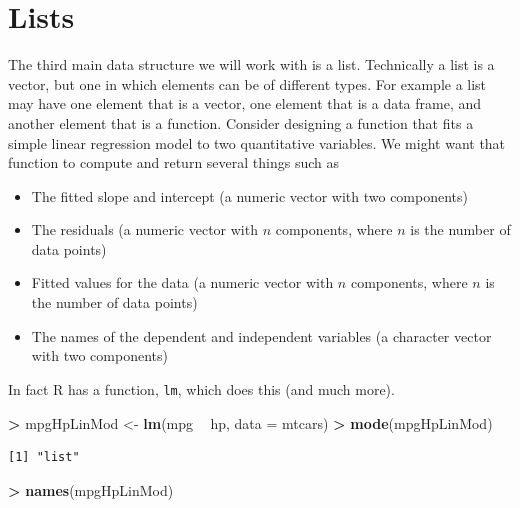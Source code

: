 \documentclass[]{krantz}
\makeatletter
\newenvironment{Shaded}{\begin{snugshade}}{\end{snugshade}}
\newcommand{\DataTypeTok}[1]{\textcolor[rgb]{0.27,0.27,0.27}{#1}}
\newcommand{\KeywordTok}[1]{\textcolor[rgb]{0.27,0.27,0.27}{\textbf{#1}}}
\newcommand{\NormalTok}[1]{#1}
\newcommand{\OperatorTok}[1]{\textcolor[rgb]{0.43,0.43,0.43}{\textbf{#1}}}
\newcommand{\StringTok}[1]{\textcolor[rgb]{0.5,0.5,0.5}{#1}}
\providecommand{\tightlist}{%
  \setlength{\itemsep}{0pt}\setlength{\parskip}{0pt}}
\newenvironment{kframe}{%
\medskip{}
\setlength{\fboxsep}{.8em}
 \def\at@end@of@kframe{}%
 \ifinner\ifhmode%
  \def\at@end@of@kframe{\end{minipage}}%
  \begin{minipage}{\columnwidth}%
 \fi\fi%
 \def\FrameCommand##1{\hskip\@totalleftmargin \hskip-\fboxsep
 \colorbox{shadecolor}{##1}\hskip-\fboxsep
     \hskip-\linewidth \hskip-\@totalleftmargin \hskip\columnwidth}%
 \MakeFramed {\advance\hsize-\width
   \@totalleftmargin\z@ \linewidth\hsize
   \@setminipage}}%
 {\par\unskip\endMakeFramed%
 \at@end@of@kframe}
\renewenvironment{Shaded}{\begin{kframe}}{\end{kframe}}
\makeatother
\begin{document}
\hypertarget{lists}{%
\section{Lists}\label{lists}}

The third main data structure we will work with is a list. Technically a list is a vector, but one in which elements can be of different types. For example a list may have one element that is a vector, one element that is a data frame, and another element that is a function. Consider designing a function that fits a simple linear regression model to two quantitative variables. We might want that function to compute and return several things such as

\begin{itemize}
\tightlist
\item
  The fitted slope and intercept (a numeric vector with two components)
\item
  The residuals (a numeric vector with \(n\) components, where \(n\) is the number of data points)
\item
  Fitted values for the data (a numeric vector with \(n\) components, where \(n\) is the number of data points)
\item
  The names of the dependent and independent variables (a character vector with two components)
\end{itemize}

In fact R has a function, \texttt{lm}, which does this (and much more).

\begin{Shaded}
\begin{Highlighting}[]
\OperatorTok{>}\StringTok{ }\NormalTok{mpgHpLinMod <-}\StringTok{ }\KeywordTok{lm}\NormalTok{(mpg }\OperatorTok{~}\StringTok{ }\NormalTok{hp, }\DataTypeTok{data =}\NormalTok{ mtcars)}
\OperatorTok{>}\StringTok{ }\KeywordTok{mode}\NormalTok{(mpgHpLinMod)}
\end{Highlighting}
\end{Shaded}

\begin{verbatim}
[1] "list"
\end{verbatim}

\begin{Shaded}
\begin{Highlighting}[]
\OperatorTok{>}\StringTok{ }\KeywordTok{names}\NormalTok{(mpgHpLinMod)}
\end{Highlighting}
\end{Shaded}
\end{document}
